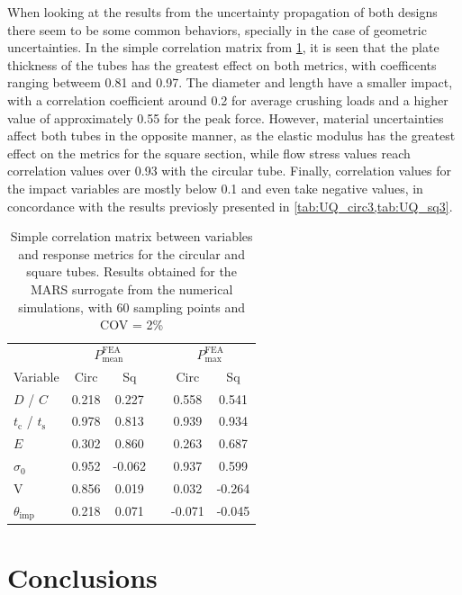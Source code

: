 \documentclass[12pt,number,preprint,review,times]{elsarticle}
\begin{document}
When looking at the results from the uncertainty propagation of both designs there seem to be some common behaviors, specially in the case of geometric uncertainties. In the simple correlation matrix from \cref{tab:corr_matrix}, it is seen that the plate thickness of the tubes has the greatest effect on both metrics, with coefficents ranging betweem 0.81 and 0.97. The diameter and length have a smaller impact, with a correlation coefficient around 0.2 for average crushing loads and a higher value of approximately 0.55 for the peak force. However, material uncertainties affect both tubes in the opposite manner, as the elastic modulus has the greatest effect on the metrics for the square section, while flow stress values reach correlation values over 0.93 with the circular tube. Finally, correlation values for the impact variables are mostly below 0.1 and even take negative values, in concordance with the results previosly presented in \cref{tab:UQ_circ3,tab:UQ_sq3}. 

\begin{table}[!htpb]
\begin{center}
\begin{tabular}[t]{lccccc} \toprule
& \multicolumn{2}{c}{$P^{\mathrm{FEA}}_{\mathrm{mean}}$} & &\multicolumn{2}{c}{$P^{\mathrm{FEA}}_{\mathrm{max}}$}  \\\cmidrule{2-3}\cmidrule{5-6}
Variable  & Circ & Sq & & Circ & Sq \\\midrule
$D$ / $C$ & 0.218 & 0.227 & & 0.558	 & 0.541 \\
$t_\mathrm{c}$ / $t_\mathrm{s}$  & 0.978 & 0.813	 & & 0.939	 & 0.934 \\\midrule
$E$ & 0.302 & 0.860	 & & 0.263	 & 0.687 \\
$\sigma_0$ & 0.952 & -0.062 & & 0.937	 & 0.599 \\\midrule
V & 0.856 & 0.019 & & 0.032	 & -0.264 \\
$\theta_{\mathrm{imp}}$ & 0.218 & 0.071	 & & -0.071	 & -0.045\\
\bottomrule
\end{tabular}
\captionsetup{justification=centering}
\caption{ Simple correlation matrix between variables and response metrics for the circular and square tubes. Results obtained for the MARS surrogate from the numerical simulations, with 60 sampling points and COV = 2\%}
\label{tab:corr_matrix}
\end{center}
\end{table}

\section{Conclusions}
\end{document}
